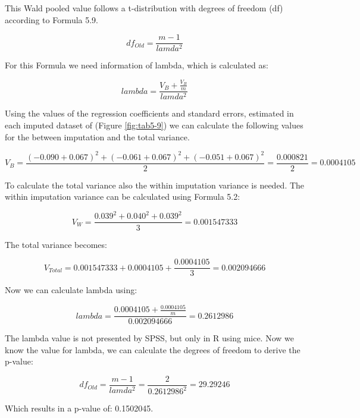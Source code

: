\documentclass[]{book}
\theoremstyle{definition}
\theoremstyle{definition}
\theoremstyle{definition}
\theoremstyle{remark}
\begin{document}
This Wald pooled value follows a t-distribution with degrees of freedom
(df) according to Formula 5.9.

\[df_{Old} = \frac{m-1}{lamda^2}\]

For this Formula we need information of lambda, which is calculated as:

\[lambda = \frac{V_B + \frac{V_B}{m}}{lamda^2}\]

Using the values of the regression coefficients and standard errors,
estimated in each imputed dataset of (Figure \ref{fig:tab5-9}) we can
calculate the following values for the between imputation and the total
variance.

\[V_B= \frac{(-0.090+0.067)^2 + (-0.061+0.067)^2 +(-0.051+0.067)^2}{2}=\frac{0.000821}{2}=0.0004105\]

To calculate the total variance also the within imputation variance is
needed. The within imputation variance can be calculated using Formula
5.2:

\[V_W= \frac{0.039^2 + 0.040^2 + 0.039^2}{3}=0.001547333\]

The total variance becomes:

\[V_{Total} = 0.001547333+0.0004105+ \frac{0.0004105}{3}=0.002094666\]

Now we can calculate lambda using:

\[lambda = \frac{0.0004105 + \frac{0.0004105}{m}}{0.002094666}=0.2612986\]

The lambda value is not presented by SPSS, but only in R using mice. Now
we know the value for lambda, we can calculate the degrees of freedom to
derive the p-value:

\[df_{Old} = \frac{m-1}{lamda^2}=\frac{2}{0.2612986^2}=29.29246\]

Which results in a p-value of: 0.1502045.


\end{document}
